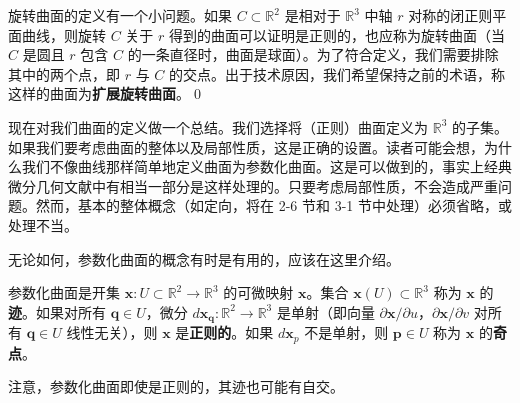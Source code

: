 \begin{Remark}[扩展旋转曲面]\label{rem:extended-surfaces-of-revolution}
旋转曲面的定义有一个小问题。如果 $C \subset \mathbb{R}^2$ 是相对于 $\mathbb{R}^3$ 中轴 $r$ 对称的闭正则平面曲线，则旋转 $C$ 关于 $r$ 得到的曲面可以证明是正则的，也应称为旋转曲面（当 $C$ 是圆且 $r$ 包含 $C$ 的一条直径时，曲面是球面）。为了符合定义，我们需要排除其中的两个点，即 $r$ 与 $C$ 的交点。出于技术原因，我们希望保持之前的术语，称这样的曲面为\textbf{扩展旋转曲面}。\qed
\end{Remark}

现在对我们曲面的定义做一个总结。我们选择将（正则）曲面定义为 $\mathbb{R}^3$ 的子集。如果我们要考虑曲面的整体以及局部性质，这是正确的设置。读者可能会想，为什么我们不像曲线那样简单地定义曲面为参数化曲面。这是可以做到的，事实上经典微分几何文献中有相当一部分是这样处理的。只要考虑局部性质，不会造成严重问题。然而，基本的整体概念（如定向，将在 2-6 节和 3-1 节中处理）必须省略，或处理不当。

无论如何，参数化曲面的概念有时是有用的，应该在这里介绍。

\begin{Definition}[参数化曲面]\label{def:parametrized-surface}
参数化曲面是开集 $\mathbf{x}: U \subset \mathbb{R}^2 \to \mathbb{R}^3$ 的可微映射 $\mathbf{x}$。集合 $\mathbf{x}(U) \subset \mathbb{R}^3$ 称为 $\mathbf{x}$ 的\textbf{迹}。如果对所有 $\mathbf{q} \in U$，微分 $d\mathbf{x}_{\mathbf{q}}: \mathbb{R}^2 \to \mathbb{R}^3$ 是单射（即向量 $\partial \mathbf{x}/\partial u$，$\partial \mathbf{x}/\partial v$ 对所有 $\mathbf{q} \in U$ 线性无关），则 $\mathbf{x}$ 是\textbf{正则的}。如果 $d\mathbf{x}_p$ 不是单射，则 $\mathbf{p} \in U$ 称为 $\mathbf{x}$ 的\textbf{奇点}。
\end{Definition}

注意，参数化曲面即使是正则的，其迹也可能有自交。

